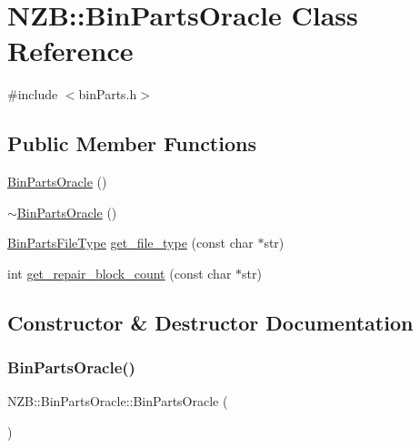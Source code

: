 \hypertarget{class_n_z_b_1_1_bin_parts_oracle}{}\section{N\+ZB\+:\+:Bin\+Parts\+Oracle Class Reference}
\label{class_n_z_b_1_1_bin_parts_oracle}


{\ttfamily \#include $<$bin\+Parts.\+h$>$}

\subsection*{Public Member Functions}
\begin{DoxyCompactItemize}
\item 
\hyperlink{class_n_z_b_1_1_bin_parts_oracle_a42304d9fc0d0fcac60060e8bce2e7580}{Bin\+Parts\+Oracle} ()
\item 
\hyperlink{class_n_z_b_1_1_bin_parts_oracle_af452167527f6b24d4cf3ae791919cbf4}{$\sim$\+Bin\+Parts\+Oracle} ()
\item 
\hyperlink{bin_parts_8h_aa1299690332d809ca3f8cb77e7019e41}{Bin\+Parts\+File\+Type} \hyperlink{class_n_z_b_1_1_bin_parts_oracle_aa861eee521123494f6d5672db18a726c}{get\+\_\+file\+\_\+type} (const char $\ast$str)
\item 
int \hyperlink{class_n_z_b_1_1_bin_parts_oracle_a5d3259b1456cf13a3f735415f2bdb92e}{get\+\_\+repair\+\_\+block\+\_\+count} (const char $\ast$str)
\end{DoxyCompactItemize}


\subsection{Constructor \& Destructor Documentation}
\hypertarget{class_n_z_b_1_1_bin_parts_oracle_a42304d9fc0d0fcac60060e8bce2e7580}{}\label{class_n_z_b_1_1_bin_parts_oracle_a42304d9fc0d0fcac60060e8bce2e7580} 
\subsubsection{\texorpdfstring{Bin\+Parts\+Oracle()}{BinPartsOracle()}}
{\footnotesize\ttfamily N\+Z\+B\+::\+Bin\+Parts\+Oracle\+::\+Bin\+Parts\+Oracle (\begin{DoxyParamCaption}{ }\end{DoxyParamCaption})}

